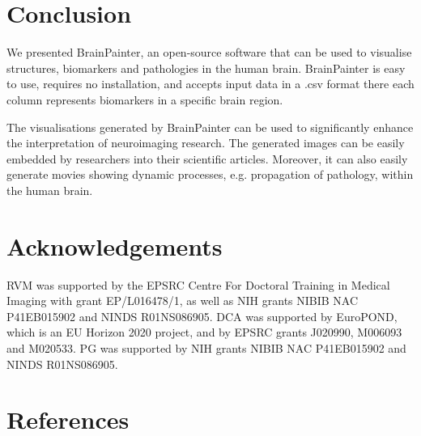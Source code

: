 \documentclass[final,times,twocolumn,authoryear]{elsarticle}
\begin{document}
\section{Conclusion}

We presented BrainPainter, an open-source software that can be used to visualise structures, biomarkers and pathologies in the human brain. BrainPainter is easy to use, requires no installation, and accepts input data in a .csv format there each column represents biomarkers in a specific brain region. 

The visualisations generated by BrainPainter can be used to significantly enhance the interpretation of neuroimaging research. The generated images can be easily embedded by researchers into their scientific articles. Moreover, it can also easily generate movies showing dynamic processes, e.g. propagation of pathology, within the human brain. 



\FloatBarrier
\section{Acknowledgements}


RVM was supported by the EPSRC Centre For Doctoral Training in Medical Imaging with grant EP/L016478/1, as well as NIH grants NIBIB NAC P41EB015902 and NINDS R01NS086905. DCA was supported by EuroPOND, which is an EU Horizon 2020 project, and by EPSRC grants J020990, M006093 and M020533. PG was supported by NIH grants NIBIB NAC P41EB015902 and NINDS R01NS086905. 

\section*{References}



\end{document}
